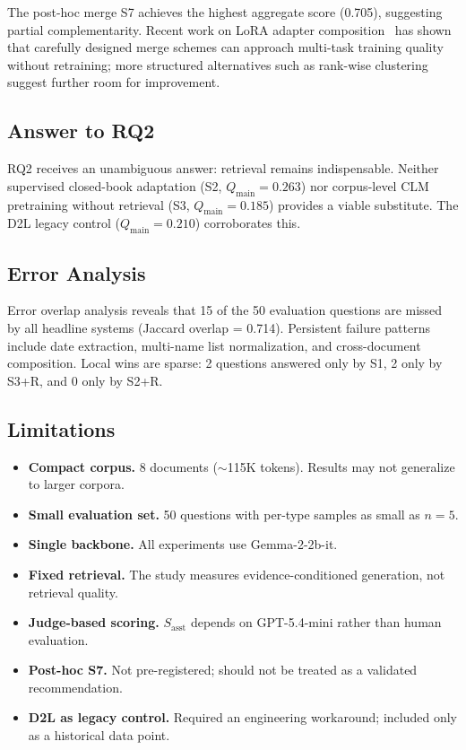 The post-hoc merge S7 achieves the highest aggregate score (0.705), suggesting partial complementarity. Recent work on LoRA adapter composition~\cite{prabhakar2024lorasoups} has shown that carefully designed merge schemes can approach multi-task training quality without retraining; more structured alternatives such as rank-wise clustering~\cite{zhao2024loralego} suggest further room for improvement.

\subsection{Answer to RQ2}

RQ2 receives an unambiguous answer: retrieval remains indispensable. Neither supervised closed-book adaptation (S2, $Q_{\text{main}} = 0.263$) nor corpus-level CLM pretraining without retrieval (S3, $Q_{\text{main}} = 0.185$) provides a viable substitute. The D2L legacy control ($Q_{\text{main}} = 0.210$) corroborates this.

\subsection{Error Analysis}

Error overlap analysis reveals that 15 of the 50 evaluation questions are missed by all headline systems (Jaccard overlap = 0.714). Persistent failure patterns include date extraction, multi-name list normalization, and cross-document composition. Local wins are sparse: 2 questions answered only by S1, 2 only by S3+R, and 0 only by S2+R.

\subsection{Limitations}

\begin{itemize}
    \item \textbf{Compact corpus.} 8 documents ($\sim$115K tokens). Results may not generalize to larger corpora.
    \item \textbf{Small evaluation set.} 50 questions with per-type samples as small as $n=5$.
    \item \textbf{Single backbone.} All experiments use Gemma-2-2b-it.
    \item \textbf{Fixed retrieval.} The study measures evidence-conditioned generation, not retrieval quality.
    \item \textbf{Judge-based scoring.} $S_{\text{asst}}$ depends on GPT-5.4-mini rather than human evaluation.
    \item \textbf{Post-hoc S7.} Not pre-registered; should not be treated as a validated recommendation.
    \item \textbf{D2L as legacy control.} Required an engineering workaround; included only as a historical data point.
\end{itemize}

